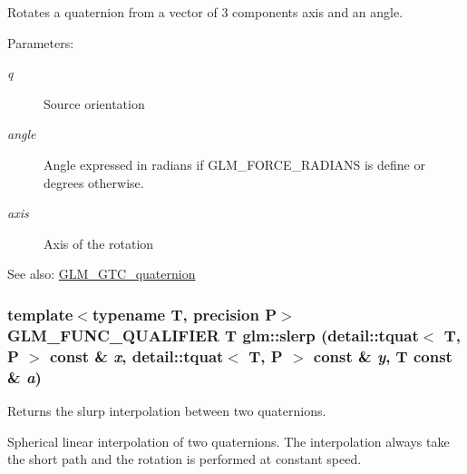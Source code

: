 Rotates a quaternion from a vector of 3 components axis and an angle.

\begin{Desc}
\item[Parameters:]
\begin{description}
\item[{\em q}]Source orientation \item[{\em angle}]Angle expressed in radians if GLM\_\-FORCE\_\-RADIANS is define or degrees otherwise. \item[{\em axis}]Axis of the rotation\end{description}
\end{Desc}
\begin{Desc}
\item[See also:]\hyperlink{group__gtc__quaternion}{GLM\_\-GTC\_\-quaternion} \end{Desc}
\hypertarget{group__gtc__quaternion_ga75cee4315cd8e7f15eaac3ea944106a}{
\subsubsection[slerp]{\setlength{\rightskip}{0pt plus 5cm}template$<$typename T, precision P$>$ GLM\_\-FUNC\_\-QUALIFIER T glm::slerp (detail::tquat$<$ T, P $>$ const \& {\em x}, \/  detail::tquat$<$ T, P $>$ const \& {\em y}, \/  T const \& {\em a})}}
\label{group__gtc__quaternion_ga75cee4315cd8e7f15eaac3ea944106a}


Returns the slurp interpolation between two quaternions. 

Spherical linear interpolation of two quaternions. The interpolation always take the short path and the rotation is performed at constant speed.

